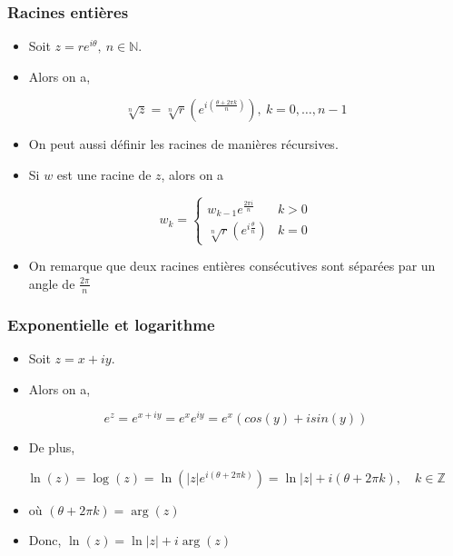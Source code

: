 \subsubsection*{Racines entières}
\begin{itemize}
    \item[] Soit $z = re^{i\theta},\ n \in \mathbb{N}$.
    \item[] Alors on a,
\end{itemize}
    \begin{equation*}
        \sqrt[n]{z} = \sqrt[n]{r} \left( e^{i \left( \frac{\theta + 2\pi k}{n} \right) } \right), \ k = 0, \dots, n - 1
    \end{equation*} 
\begin{itemize}
  \item[] On peut aussi définir les racines de manières récursives.
  \item[] Si $w$ est une racine de $z$, alors on a
\end{itemize}
    \begin{equation*}
        w_k = \begin{cases} 
            w_{k - 1}e^{ \frac{2\pi i}{n} } & k > 0 \\[0.5em]
            \sqrt[n]{r} \left( e^{i \frac{\theta}{n} } \right) & k = 0
        \end{cases}
    \end{equation*} 
\begin{itemize}
   \item[] On remarque que deux racines entières consécutives sont séparées par un angle de $\frac{2\pi}{n}$    
\end{itemize}


\subsubsection*{Exponentielle  et logarithme}
\begin{itemize}
    \item[] Soit $z = x + iy$. 
    \item[] Alors on a,
\end{itemize}
\begin{equation*}
    e^z = e^{x + iy} = e^x e^{iy} = e^x (cos(y) + isin(y)) 
\end{equation*}
\begin{itemize}
    \item[] De plus,
\end{itemize}
\begin{equation*}
    \ln(z) = \log(z) = \ln(|z|e^{i(\theta + 2\pi k)}) = \ln|z| + i(\theta + 2\pi k), \quad k \in \mathbb{Z}
\end{equation*}
\begin{itemize}
    \item[] où $(\theta + 2\pi k) = \arg(z)$ 
    \item[] Donc, $\ln(z) = \ln|z| + i\arg(z)$
\end{itemize}


